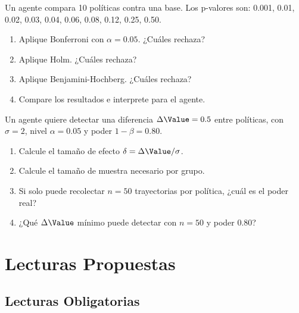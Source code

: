 \begin{exercise}
	\label{ex:ch4-ej4}
	Un agente compara 10 políticas contra una base. Los p-valores son:
	0.001, 0.01, 0.02, 0.03, 0.04, 0.06, 0.08, 0.12, 0.25, 0.50.
	\begin{enumerate}[label=(\alph*)]
		\item Aplique Bonferroni con $\alpha = 0.05$. ¿Cuáles rechaza?
		\item Aplique Holm. ¿Cuáles rechaza?
		\item Aplique Benjamini-Hochberg. ¿Cuáles rechaza?
		\item Compare los resultados e interprete para el agente.
	\end{enumerate}
\end{exercise}

\begin{exercise}
	\label{ex:ch4-ej5}
	Un agente quiere detectar una diferencia $\Delta \Value = 0.5$ entre
	políticas, con $\sigma = 2$, nivel $\alpha = 0.05$ y poder $1-\beta = 0.80$.
	\begin{enumerate}[label=(\alph*)]
		\item Calcule el tamaño de efecto $\delta = \Delta \Value / \sigma$.
		\item Calcule el tamaño de muestra necesario por grupo.
		\item Si solo puede recolectar $n = 50$ trayectorias por política,
		      ¿cuál es el poder real?
		\item ¿Qué $\Delta \Value$ mínimo puede detectar con $n = 50$ y
		      poder 0.80?
	\end{enumerate}
\end{exercise}


\section{Lecturas Propuestas}
\label{sec:ch4-lecturas}

\subsection*{Lecturas Obligatorias}

